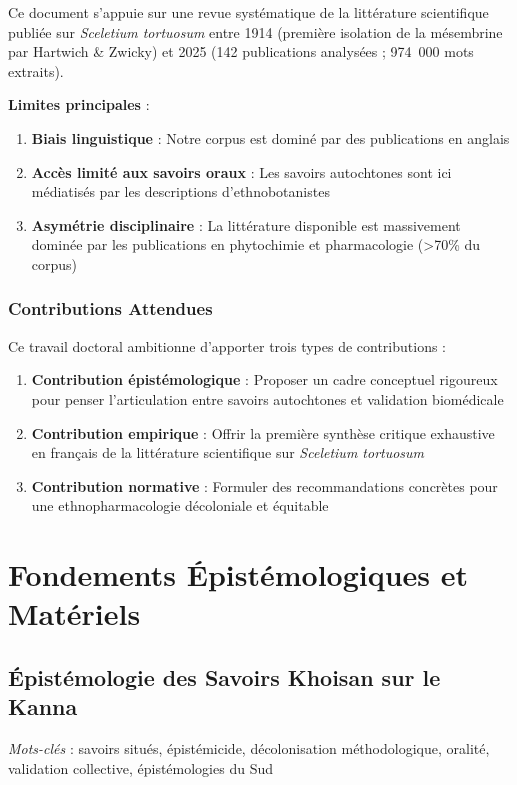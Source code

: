\documentclass[12pt,a4paper]{report}
\begin{document}
Ce document s'appuie sur une revue systématique de la littérature scientifique publiée sur \textit{Sceletium tortuosum} entre 1914 (première isolation de la mésembrine par Hartwich \& Zwicky) et 2025 (142 publications analysées ; 974~000 mots extraits).

\textbf{Limites principales} :
\begin{enumerate}
\item \textbf{Biais linguistique} : Notre corpus est dominé par des publications en anglais
\item \textbf{Accès limité aux savoirs oraux} : Les savoirs autochtones sont ici médiatisés par les descriptions d'ethnobotanistes
\item \textbf{Asymétrie disciplinaire} : La littérature disponible est massivement dominée par les publications en phytochimie et pharmacologie (>70\% du corpus)
\end{enumerate}

\section{Contributions Attendues}

Ce travail doctoral ambitionne d'apporter trois types de contributions :

\begin{enumerate}
\item \textbf{Contribution épistémologique} : Proposer un cadre conceptuel rigoureux pour penser l'articulation entre savoirs autochtones et validation biomédicale
\item \textbf{Contribution empirique} : Offrir la première synthèse critique exhaustive en français de la littérature scientifique sur \textit{Sceletium tortuosum}
\item \textbf{Contribution normative} : Formuler des recommandations concrètes pour une ethnopharmacologie décoloniale et équitable
\end{enumerate}

\part{Fondements Épistémologiques et Matériels}

\chapter{Épistémologie des Savoirs Khoisan sur le Kanna}

\textit{Mots-clés} : savoirs situés, épistémicide, décolonisation méthodologique, oralité, validation collective, épistémologies du Sud
\end{document}
